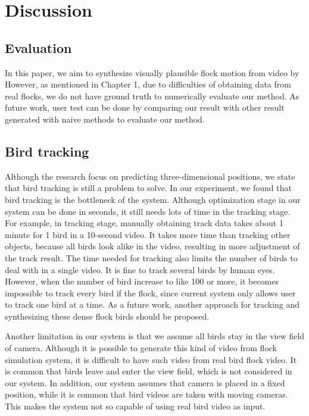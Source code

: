 \chapter{Discussion}


\section{Evaluation}


In this paper, we aim to synthesize visually plausible flock motion from video by However, as mentioned in Chapter 1, due to difficulties of obtaining data from real flocks, we do not have ground truth to numerically evaluate our method. As future work, user test can be done by comparing our result with other result generated with naive methods to evaluate our method.


\section{Bird tracking}


Although the research focus on predicting three-dimensional positions, we state that bird tracking is still a problem to solve. In our experiment, we found that bird tracking is the bottleneck of the system. Although optimization stage in our system can be done in seconds, it still needs lots of time in the tracking stage. For example, in tracking stage, manually obtaining track data takes about 1 minute for 1 bird in a 10-second video. It takes more time than tracking other objects, because all birds look alike in the video, resulting in more adjustment of the track result. The time needed for tracking also limits the number of birds to deal with in a single video. It is fine to track several birds by human eyes. However, when the number of bird increase to like 100 or more, it becomes impossible to track every bird if the flock, since current system only allows user to track one bird at a time. As a future work, another approach for tracking and synthesizing these dense flock birds should be proposed.


Another limitation in our system is that we assume all birds stay in the view field of camera. Although it is possible to generate this kind of video from flock simulation system, it is difficult to have such video from real bird flock video. It is common that birds leave and enter the view field, which is not considered in our system. In addition, our system assumes that camera is placed in a fixed position, while it is common that bird videos are taken with moving cameras. This makes the system not so capable of using real bird video as input.


